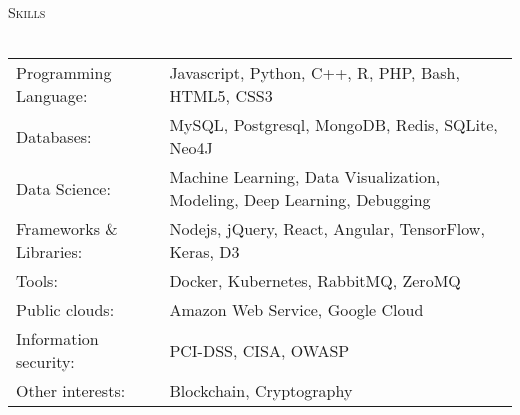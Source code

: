 \documentclass[a4paper]{article}
\newcommand{\lineunder} {
    \vspace*{-8pt} \\
    \hspace*{-18pt} \hrulefill \\
}
\newcommand{\header} [1] {
    {\hspace*{-18pt}\vspace*{6pt} \textsc{#1}}
    \vspace*{-6pt} \lineunder
}
\begin{document}
\header{Skills}
\begin{tabular}{ l l }
	Programming Language:    & Javascript, Python, C++, R, PHP, Bash, HTML5, CSS3                       \\
	Databases:               & MySQL, Postgresql, MongoDB, Redis, SQLite, Neo4J                         \\
	Data Science:            & Machine Learning, Data Visualization, Modeling, Deep Learning, Debugging \\
	Frameworks \& Libraries: & Nodejs, jQuery, React, Angular, TensorFlow, Keras, D3                    \\
	Tools:                   & Docker, Kubernetes, RabbitMQ, ZeroMQ                                     \\
	Public clouds:           & Amazon Web Service, Google Cloud                                         \\
	Information security:    & PCI-DSS, CISA, OWASP                                                     \\
	Other interests:         & Blockchain, Cryptography                                                 \\
\end{tabular}
\vspace{2mm}



\ 
\end{document}
